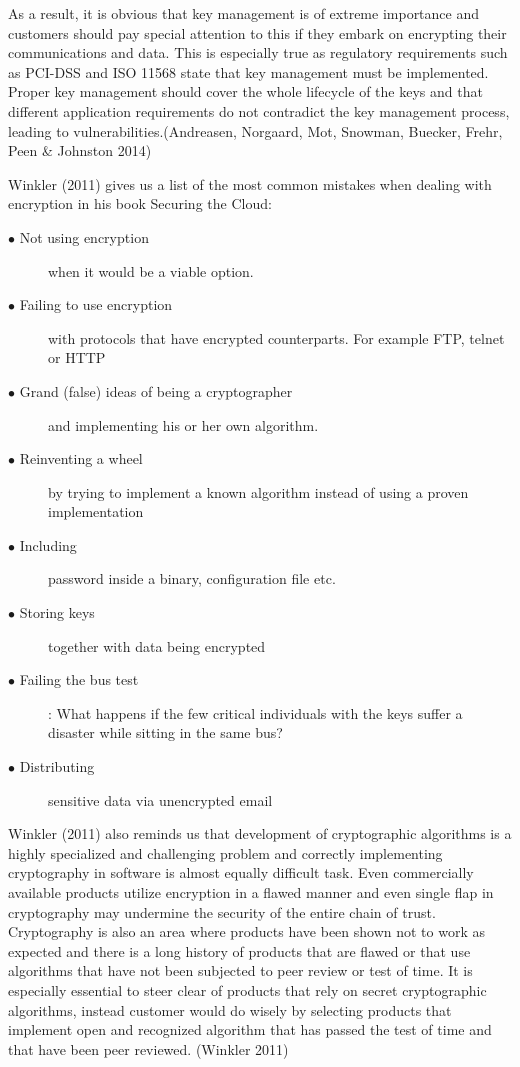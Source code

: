 \documentclass{article}
\begin{document}
\par
As a result, it is obvious that key management is of extreme importance and customers should pay special attention to this if they embark on encrypting their communications and data. This is especially true as regulatory requirements such as PCI-DSS and ISO 11568 state that key management must be implemented. Proper key management should cover the whole lifecycle of the keys and that different application requirements do not contradict the key management process, leading to vulnerabilities.(Andreasen, Norgaard, Mot, Snowman, Buecker, Frehr, Peen \& Johnston 2014)
\par
Winkler (2011) gives us a list of the most common mistakes when dealing with encryption in his book Securing the Cloud:
\begin{description}
	\item[$\bullet$ Not using encryption] when it would be a viable option.
	\item[$\bullet$ Failing to use encryption] with protocols that have encrypted counterparts. For example FTP, telnet or HTTP 
	\item[$\bullet$ Grand (false) ideas of being a cryptographer] and implementing his or her own algorithm. 
	\item[$\bullet$ Reinventing a wheel] by trying to implement a known algorithm instead of using a proven implementation
	\item[$\bullet$ Including] password inside a binary, configuration file etc.
	\item[$\bullet$ Storing keys] together with data being encrypted
	\item[$\bullet$ Failing the bus test]: What happens if the few critical individuals with the keys suffer a disaster while sitting in the same bus? 
	\item[$\bullet$ Distributing] sensitive data via unencrypted email
\end{description} 
Winkler (2011) also reminds us that development of cryptographic algorithms is a highly specialized and challenging problem and correctly implementing cryptography in software is almost equally difficult task. Even commercially available products utilize encryption in a flawed manner and even single flap in cryptography may undermine the security of the entire chain of trust. Cryptography is also an area where products have been shown not to work as expected and there is a long history of products that are flawed or that use algorithms that have not been subjected to peer review or test of time. It is especially essential to steer clear of products that rely on secret cryptographic algorithms, instead customer would do wisely by selecting products that implement open and recognized algorithm that has passed the test of time and that have been peer reviewed. (Winkler 2011)
\end{document}

